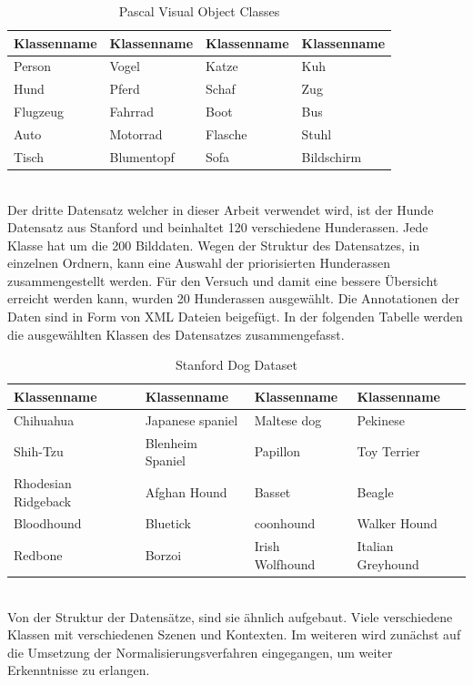 \documentclass[a4paper,12pt,oneside]{article}
\begin{document}
\begin{table}
[h]
\caption{Pascal Visual Object Classes \cite{pascal-voc-2007}}
\centering
\begin{tabular}{|l|l|l|l|}
\hline
Klassenname & Klassenname & Klassenname & Klassenname\\
\hline
Person & Vogel & Katze & Kuh\\
Hund & Pferd & Schaf & Zug\\
Flugzeug & Fahrrad & Boot & Bus\\
Auto & Motorrad & Flasche & Stuhl\\
Tisch & Blumentopf & Sofa & Bildschirm\\
\hline
\end{tabular}
\label{tab:pvoc}
\end{table}\\
Der dritte Datensatz welcher in dieser Arbeit verwendet wird, ist der Hunde Datensatz aus Stanford und beinhaltet 120 verschiedene Hunderassen. Jede Klasse hat um die 200 Bilddaten. Wegen der Struktur des Datensatzes, in einzelnen Ordnern, kann eine Auswahl der priorisierten Hunderassen zusammengestellt werden. Für den Versuch und damit eine bessere Übersicht erreicht werden kann, wurden 20 Hunderassen ausgewählt. Die Annotationen der Daten sind in Form von XML Dateien beigefügt. In der folgenden Tabelle werden die ausgewählten Klassen des Datensatzes zusammengefasst.\\
\begin{table}
[h]
\caption{Stanford Dog Dataset \cite{KhoslaYaoJayadevaprakashFeiFei_FGVC2011}}
\centering
\begin{tabular}{|l|l|l|l|}
\hline
Klassenname & Klassenname & Klassenname & Klassenname\\
\hline
Chihuahua & Japanese spaniel & Maltese dog & Pekinese\\
Shih-Tzu & Blenheim Spaniel & Papillon & Toy Terrier\\
Rhodesian Ridgeback & Afghan Hound & Basset & Beagle\\
Bloodhound & Bluetick & coonhound & Walker Hound\\
Redbone & Borzoi & Irish Wolfhound & Italian Greyhound\\
\hline
\end{tabular}
\end{table}\\
Von der Struktur der Datensätze, sind sie ähnlich aufgebaut. Viele verschiedene Klassen mit verschiedenen Szenen und Kontexten. Im weiteren wird zunächst auf die Umsetzung der Normalisierungsverfahren eingegangen, um weiter Erkenntnisse zu erlangen.
\newpage
\end{document}

